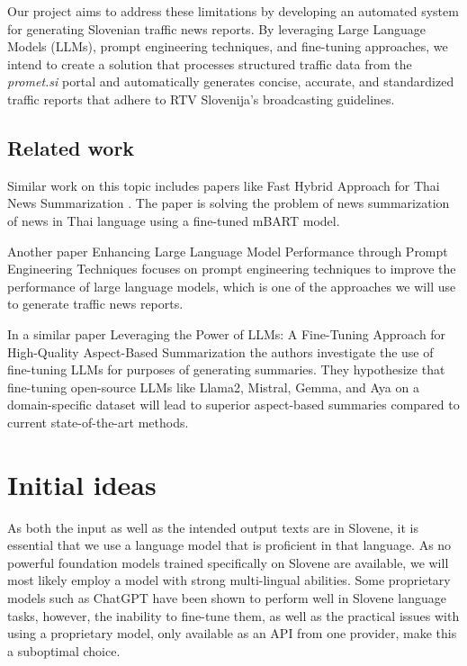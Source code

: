 \documentclass[fleqn,moreauthors,10pt]{ds_report}
\begin{document}
Our project aims to address these limitations by developing an automated system for generating Slovenian traffic news reports. By leveraging Large Language Models (LLMs), prompt engineering techniques, and fine-tuning approaches, we intend to create a solution that processes structured traffic data from the \textit{promet.si} portal and automatically generates concise, accurate, and standardized traffic reports that adhere to RTV Slovenija's broadcasting guidelines.


\subsection*{Related work}

Similar work on this topic includes papers like Fast Hybrid Approach for Thai News Summarization \cite{thai_news}. The paper is solving the problem of news summarization of news in Thai language using a fine-tuned mBART model.

Another paper Enhancing Large Language Model Performance through Prompt Engineering Techniques \cite{c1} focuses on prompt engineering techniques to improve the performance of large language models, which is one of the approaches we will use to generate traffic news reports.

In a similar paper Leveraging the Power of LLMs: A Fine-Tuning Approach for High-Quality Aspect-Based Summarization \cite{mullick2024leveragingpowerllmsfinetuning} the authors investigate the use of fine-tuning LLMs for purposes of generating summaries. They hypothesize that fine-tuning open-source LLMs like Llama2, Mistral, Gemma, and Aya on a domain-specific dataset will lead to superior aspect-based summaries compared to current state-of-the-art methods.


\section*{Initial ideas}

As both the input as well as the intended output texts are in Slovene, it is essential that we use a language model that is proficient in that language. As no powerful foundation models trained specifically on Slovene are available, we will most likely employ a model with strong multi-lingual abilities. Some proprietary models such as ChatGPT have been shown to perform well in Slovene language tasks, however, the inability to fine-tune them, as well as the practical issues with using a proprietary model, only available as an API from one provider, make this a suboptimal choice.
\end{document}
